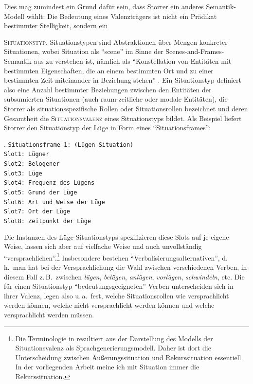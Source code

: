 Dies mag zumindest ein Grund dafür sein, dass Storrer ein anderes Semantik-Modell wählt: Die Bedeutung eines Valenzträgers ist nicht ein Prädikat bestimmter Stelligkeit, sondern ein {\textsc{Situationstyp}. Situationstypen sind Abstraktionen über Mengen konkreter Situationen, wobei Situation als "`scene"' im Sinne der Scenes-and-Frames-Semantik aus \cite{Fillmore:77,Fillmore:77b} zu verstehen ist, nämlich als "`Konstellation von Entitäten mit bestimmten Eigenschaften, die an einem bestimmten Ort und zu einer bestimmten Zeit miteinander in Beziehung stehen"' \citep[232]{Storrer:96}. Ein Situationstyp definiert also eine Anzahl bestimmter Beziehungen zwischen den Entitäten der subsumierten Situationen (auch raum-zeitliche oder modale Entitäten), die Storrer als situationsspezifische Rollen oder Situationsrollen bezeichnet und deren Gesamtheit die \textsc{Situationsvalenz} eines Situationstyps bildet. Als Beispiel liefert Storrer den Situationstyp der Lüge in Form eines "`Situationsframes"': 

\ex. \label{ex-storrer-lüge} {\tt Situationsframe\_1: (Lügen\_Situation) \\[1.5ex] 
Slot1: Lügner \\
Slot2: Belogener \\
Slot3: Lüge \\
Slot4: Frequenz des Lügens \\
Slot5: Grund der Lüge \\
Slot6: Art und Weise der Lüge \\
Slot7: Ort der Lüge \\
Slot8: Zeitpunkt der Lüge \\[1.5ex]
}
\citep[286]{Storrer:92}

Die Instanzen des Lüge-Situationstyps spezifizieren diese Slots auf je eigene Weise, lassen sich aber auf vielfache Weise und auch unvollständig "`versprachlichen"'.\footnote{Die Terminologie in \cite{Storrer:92,Storrer:96} resultiert aus der Darstellung des Modells der Situationsvalenz als Sprachgenerierungsmodell. Daher ist dort die Unterscheidung zwischen Äu\ss erungssituation und Rekurssituation essentiell. In der vorliegenden Arbeit meine ich mit Situation immer die Rekurssituation.} Insbesondere bestehen "`Verbalisierungsalternativen"', d.\,h.\ man hat bei der Versprachlichung die Wahl zwischen verschiedenen Verben, in diesem Fall z.\,B.\ zwischen {\it lügen}, {\it belügen}, {\it anlügen}, {\it vorlügen}, {\it schwindeln}, etc. Die für einen Situationstyp "`bedeutungsgeeigneten"' Verben unterscheiden sich in ihrer Valenz, legen also u.\,a.\ fest, welche Situationsrollen wie versprachlicht werden können, welche nicht versprachlicht werden können und welche versprachlicht werden müssen. 

}
